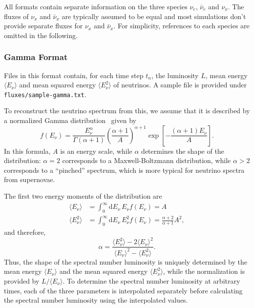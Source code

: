 \documentclass[11pt, oneside]{article}
\renewcommand{\d}{\mathrm{d}}
\newcommand{\mean}[1]{\ensuremath{\langle #1 \rangle}}
\newcommand{\nue}{\ensuremath{\nu_e}\xspace}
\newcommand{\nux}{\ensuremath{\nu_x}\xspace}
\newcommand{\nuebar}{\ensuremath{\bar{\nu}_e}\xspace}
\newcommand{\nuxbar}{\ensuremath{\bar{\nu}_x}\xspace}
\begin{document}
All formats contain separate information on the three species \nue, \nuebar and \nux.
The fluxes of \nux and \nuxbar are typically assumed to be equal and most simulations don’t provide separate fluxes for \nux and \nuxbar.
For simplicity, references to each species are omitted in the following.

\subsubsection{Gamma Format}\label{sec:format-gamma}
Files in this format contain, for each time step $t_n$, the luminosity $L$, mean energy $\mean{E_\nu}$ and mean squared energy $\mean{E_\nu^2}$ of neutrinos.
A sample file is provided under \texttt{fluxes/sample-gamma.txt}.
%

To reconstruct the neutrino spectrum from this, we assume that it is described by a normalized Gamma distribution~\cite{Keil2003,Tamborra2012} given by
\begin{equation}
f (E_\nu) = \frac{E_\nu^\alpha}{\Gamma (\alpha + 1)} \left( \frac{\alpha + 1}{A} \right)^{\alpha + 1} \exp \left[ - \frac{(\alpha + 1) E_\nu}{A} \right].
\end{equation}
In this formula, $A$ is an energy scale, while $\alpha$ determines the shape of the distribution: $\alpha = 2$ corresponds to a Maxwell-Boltzmann distribution, while $\alpha > 2$ corresponds to a “pinched” spectrum, which is more typical for neutrino spectra from supernovae.

The first two energy moments of the distribution are
\begin{align}
\mean{E_\nu}	&= \int_0^\infty \d E_\nu\, E_\nu f(E_\nu) = A\\
\mean{E_\nu^2}&= \int_0^\infty \d E_\nu\, E_\nu^2 f(E_\nu) = \frac{\alpha + 2}{\alpha + 1} A^2,
\end{align}
and therefore,
\begin{equation}
\alpha = \frac{\mean{E_\nu^2} - 2 \mean{E_\nu}^2}{\mean{E_\nu}^2 - \mean{E_\nu^2}}.
\end{equation}
Thus, the shape of the spectral number luminosity is uniquely determined by the mean energy \mean{E_\nu} and the mean squared energy \mean{E_\nu^2}, while the normalization is provided by $L / \mean{E_\nu}$.
To determine the spectral number luminosity at arbitrary times, each of the three parameters is interpolated separately before calculating the spectral number luminosity using the interpolated values.
\end{document}
